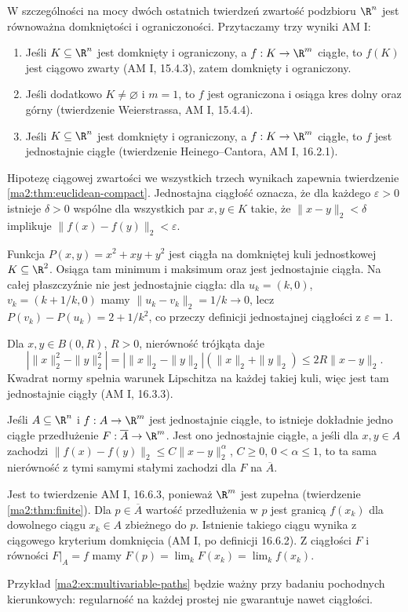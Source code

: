 W szczególności na mocy dwóch ostatnich twierdzeń
zwartość podzbioru $\R^n$ jest równoważna domkniętości
i ograniczoności.
Przytaczamy trzy wyniki AM I:
\begin{enumerate}[label=(\roman*)]
 \item Jeśli $K\subseteq\R^n$ jest domknięty i ograniczony,
 a $f:K\to\R^m$ ciągłe, to $f(K)$ jest ciągowo zwarty
 (AM I, 15.4.3), zatem domknięty i ograniczony.
 \item Jeśli dodatkowo $K\ne\varnothing$ i $m=1$, to $f$
 jest ograniczona i osiąga kres dolny oraz górny
 (twierdzenie Weierstrassa, AM I, 15.4.4).
 \item Jeśli $K\subseteq\R^n$ jest domknięty i ograniczony,
 a $f:K\to\R^m$ ciągłe, to $f$ jest jednostajnie ciągłe
 (twierdzenie Heinego--Cantora, AM I, 16.2.1).
\end{enumerate}
Hipotezę ciągowej zwartości we wszystkich trzech wynikach
zapewnia twierdzenie \ref{ma2:thm:euclidean-compact}.
Jednostajna ciągłość oznacza, że dla każdego $\varepsilon>0$
istnieje $\delta>0$ wspólne dla wszystkich par $x,y\in K$
takie, że $\|x-y\|_2<\delta$ implikuje
$\|f(x)-f(y)\|_2<\varepsilon$.

\begin{przyklad}
Funkcja $P(x,y)=x^2+xy+y^2$ jest ciągła na
domkniętej kuli jednostkowej $K\subseteq\R^2$.
Osiąga tam minimum i maksimum oraz jest jednostajnie ciągła.
Na całej płaszczyźnie nie jest jednostajnie ciągła:
dla $u_k=(k,0)$, $v_k=(k+1/k,0)$ mamy
$\|u_k-v_k\|_2=1/k\to0$, lecz
$P(v_k)-P(u_k)=2+1/k^2$, co przeczy definicji
jednostajnej ciągłości z $\varepsilon=1$.
\end{przyklad}

\begin{przyklad}
Dla $x,y\in B(0,R)$, $R>0$, nierówność trójkąta daje
\[
 |\|x\|_2^2-\|y\|_2^2|
 =|\|x\|_2-\|y\|_2|(\|x\|_2+\|y\|_2)
 \le 2R\|x-y\|_2.
\]
Kwadrat normy spełnia warunek Lipschitza na każdej takiej
kuli, więc jest tam jednostajnie ciągły (AM I, 16.3.3).
\end{przyklad}

\begin{wniosek}
\label{ma2:cor:multi-uniform-extension}
Jeśli $A\subseteq\R^n$ i $f:A\to\R^m$ jest
jednostajnie ciągłe, to istnieje dokładnie jedno
ciągłe przedłużenie $F:\overline A\to\R^m$.
Jest ono jednostajnie ciągłe, a jeśli dla $x,y\in A$
zachodzi $\|f(x)-f(y)\|_2\le C\|x-y\|_2^\alpha$,
$C\ge0$, $0<\alpha\le1$, to ta sama nierówność
z tymi samymi stałymi zachodzi dla $F$ na $\overline A$.
\end{wniosek}
Jest to twierdzenie AM I, 16.6.3, ponieważ $\R^m$ jest
zupełna (twierdzenie \ref{ma2:thm:finite}).
Dla $p\in\overline A$ wartość przedłużenia w $p$
jest granicą $f(x_k)$ dla dowolnego ciągu $x_k\in A$
zbieżnego do $p$. Istnienie takiego ciągu wynika
z ciągowego kryterium domknięcia (AM I, po definicji
16.6.2). Z ciągłości $F$ i równości $F|_A=f$ mamy
$F(p)=\lim_k F(x_k)=\lim_k f(x_k)$.

Przykład \ref{ma2:ex:multivariable-paths} będzie ważny
przy badaniu pochodnych kierunkowych: regularność
na każdej prostej nie gwarantuje nawet ciągłości.

